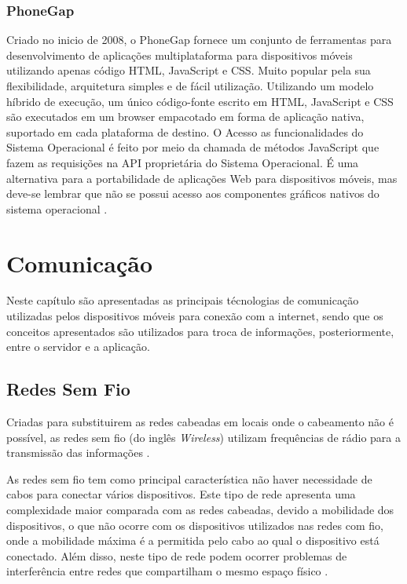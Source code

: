 \subsection{PhoneGap}
Criado no inicio de 2008, o PhoneGap fornece um conjunto de ferramentas para desenvolvimento de aplicações multiplataforma para dispositivos móveis utilizando apenas código HTML, JavaScript e CSS. Muito popular pela sua flexibilidade, arquitetura simples e de fácil utilização. Utilizando um modelo híbrido de execução, um único código-fonte escrito em HTML, JavaScript e CSS são executados em um browser empacotado em forma de aplicação nativa, suportado em cada plataforma de destino. O Acesso as funcionalidades do Sistema Operacional é feito por meio da chamada de métodos JavaScript que fazem as requisições na API proprietária do Sistema Operacional. É uma alternativa para a portabilidade de aplicações Web para dispositivos móveis, mas deve-se lembrar que não se possui acesso aos componentes gráficos nativos do sistema operacional
\cite{CrossPlatformMobileDevelopment2011}.

\chapter{Comunicação}
Neste capítulo são apresentadas as principais técnologias de comunicação utilizadas pelos dispositivos móveis para conexão com a internet, sendo que os conceitos apresentados são utilizados para troca de informações, posteriormente, entre o servidor e a aplicação.

\section{Redes Sem Fio}
Criadas para substituirem as redes cabeadas em locais onde o cabeamento não é possível, as redes sem fio (do inglês \emph{Wireless}) utilizam frequências de rádio para a transmissão das informações \cite{RedesSemFioUFLA}.

As redes sem fio tem como principal característica não haver necessidade de cabos para conectar vários dispositivos. Este tipo de rede apresenta uma complexidade maior comparada com as redes cabeadas, devido a mobilidade dos dispositivos, o que não ocorre com os dispositivos utilizados nas redes com fio, onde a mobilidade máxima é a permitida pelo cabo ao qual o dispositivo está conectado. Além disso, neste tipo de rede podem ocorrer problemas de interferência entre redes que compartilham o mesmo espaço físico \cite{IEEE80211}.

